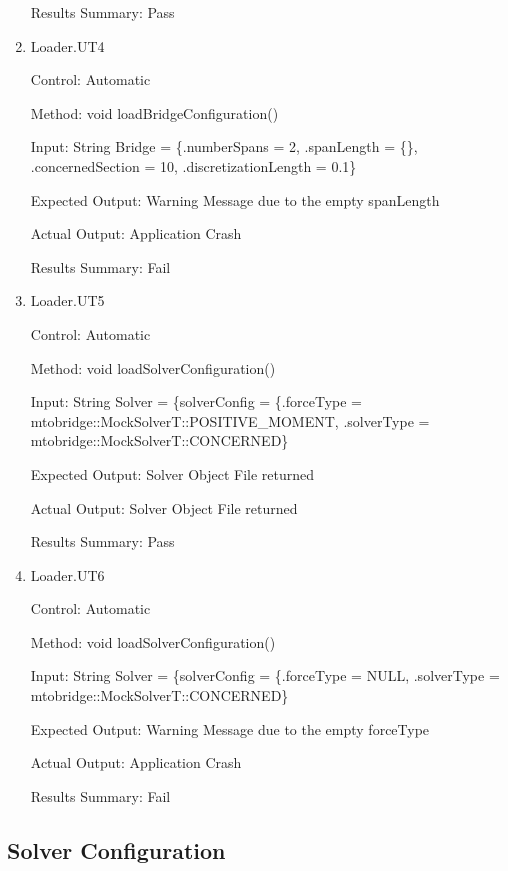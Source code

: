 \documentclass[12pt, titlepage]{article}
\begin{document}
\begin{enumerate}
    Results Summary: Pass

    \item{Loader.UT4\\}
    
    Control: Automatic
    
    Method:  void loadBridgeConfiguration()
    
    Input: String Bridge = \{.numberSpans = 2,
                         .spanLength = \{\},
                         .concernedSection = 10,
                         .discretizationLength = 0.1\}
    
    Expected Output: Warning Message due to the empty spanLength

    Actual Output: Application Crash

    Results Summary: Fail

    \item{Loader.UT5\\}
    
    Control: Automatic
    
    Method:  void loadSolverConfiguration()
    
    Input: String Solver = \{solverConfig = \{.forceType = mtobridge::MockSolverT::POSITIVE\_MOMENT,
                         .solverType = mtobridge::MockSolverT::CONCERNED\}
    
    Expected Output: Solver Object File returned 

    Actual Output: Solver Object File returned 

    Results Summary: Pass

    \item{Loader.UT6\\}
    
    Control: Automatic
    
    Method:  void loadSolverConfiguration()
    
    Input: String Solver = \{solverConfig = \{.forceType = NULL,
                         .solverType = mtobridge::MockSolverT::CONCERNED\}
    
    Expected Output: Warning Message due to the empty forceType

    Actual Output: Application Crash

    Results Summary: Fail

    
\end{enumerate}

\subsection{Solver Configuration}
\end{document}

